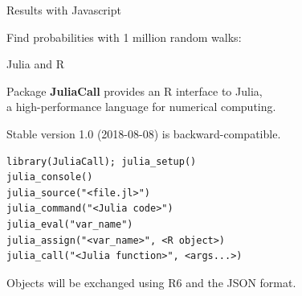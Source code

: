 \documentclass[ignorenonframetext,]{beamer}
\newenvironment{Shaded}{\begin{snugshade}}{\end{snugshade}}
\newcommand{\CommentTok}[1]{\textcolor[rgb]{0.56,0.35,0.01}{\textit{#1}}}
\newcommand{\KeywordTok}[1]{\textcolor[rgb]{0.13,0.29,0.53}{\textbf{#1}}}
\newcommand{\NormalTok}[1]{#1}
\newcommand{\OperatorTok}[1]{\textcolor[rgb]{0.81,0.36,0.00}{\textbf{#1}}}
\newcommand{\StringTok}[1]{\textcolor[rgb]{0.31,0.60,0.02}{#1}}
\begin{document}
\begin{frame}[fragile]{Results with Javascript}
\protect\hypertarget{results-with-javascript}{}

Find probabilities with 1 million random walks:

\begin{Shaded}
\end{Shaded}

\end{frame}

\begin{frame}[fragile]{Julia and R}
\protect\hypertarget{julia-and-r}{}

Package \textbf{JuliaCall} provides an R interface to Julia,\\
a high-performance language for numerical computing.

Stable version 1.0 (2018-08-08) is backward-compatible.

\begin{verbatim}
library(JuliaCall); julia_setup()
julia_console()
julia_source("<file.jl>")
julia_command("<Julia code>")
julia_eval("var_name")
julia_assign("<var_name>", <R object>)
julia_call("<Julia function>", <args...>)
\end{verbatim}

Objects will be exchanged using R6 and the JSON format.

\end{frame}
\end{document}
